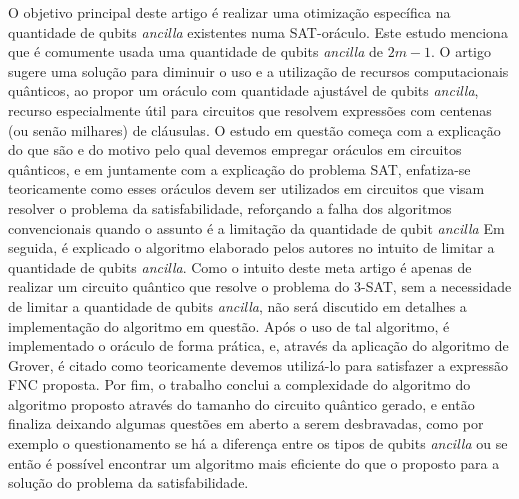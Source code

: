 \documentclass[12pt]{article}
\begin{document}
\textbf{\cite{yang:23}} 
O objetivo principal deste artigo é realizar uma otimização específica na quantidade de qubits \textit{ancilla} existentes numa SAT-oráculo. Este estudo menciona que é comumente usada uma quantidade de qubits \textit{ancilla} de \( 2m - 1 \). O artigo sugere uma solução para diminuir o uso e a utilização de recursos computacionais quânticos, ao propor um oráculo com quantidade ajustável de qubits \textit{ancilla}, recurso especialmente útil para circuitos que resolvem expressões com centenas (ou senão milhares) de cláusulas.
O estudo em questão começa com a explicação do que são e do motivo pelo qual devemos empregar oráculos em circuitos quânticos, e em juntamente com a explicação do problema SAT, enfatiza-se teoricamente como esses oráculos devem ser utilizados em circuitos que visam resolver o problema da satisfabilidade, reforçando a falha dos algoritmos convencionais quando o assunto é a limitação da quantidade de qubit \textit{ancilla}
Em seguida, é explicado o algoritmo elaborado pelos autores no intuito de limitar a quantidade de qubits \textit{ancilla}. Como o intuito deste meta artigo é apenas de realizar um circuito quântico que resolve o problema do 3-SAT, sem a necessidade de limitar a quantidade de qubits \textit{ancilla}, não será discutido em detalhes a implementação do algoritmo em questão.
Após o uso de tal algoritmo, é implementado o oráculo de forma prática, e, através da aplicação do algoritmo de Grover, é citado como teoricamente devemos utilizá-lo para satisfazer a expressão FNC proposta.
Por fim, o trabalho conclui a complexidade do algoritmo do algoritmo proposto através do tamanho do circuito quântico gerado, e então finaliza deixando algumas questões em aberto a serem desbravadas, como por exemplo o questionamento se há a diferença entre os tipos de qubits \textit{ancilla} ou se então é possível encontrar um algoritmo mais eficiente do que o proposto para a solução do problema da satisfabilidade.
\end{document}
